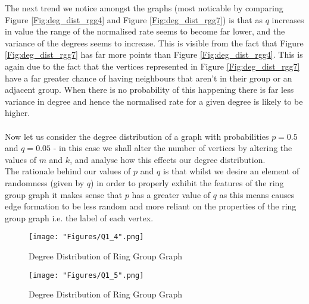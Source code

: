 \documentclass[12pt, a4paper]{article}
\begin{document}
The next trend we notice amongst the graphs (most noticable by comparing Figure \ref{Fig:deg_dist_rgg4} and Figure \ref{Fig:deg_dist_rgg7}) is that as $q$ increases in value the range of the normalised rate seems to become far lower, and the variance of the degrees seems to increase. This is visible from the fact that Figure \ref{Fig:deg_dist_rgg7} has far more points than Figure \ref{Fig:deg_dist_rgg4}. This is again due to the fact that the vertices represented in Figure \ref{Fig:deg_dist_rgg7} have a far greater chance of having neighbours that aren't in their group or an adjacent group. When there is no probability of this happening there is far less variance in degree and hence the normalised rate for a given degree is likely to be higher.\\
\\
Now let us consider the degree distribution of a graph with probabilities $p=0.5$ and $q=0.05$ - in this case we shall alter the number of vertices by altering the values of $m$ and $k$, and analyse how this effects our degree distribution.\\
 The rationale behind our values of $p$ and $q$ is that whilst we desire an element of randomness (given by $q$) in order to properly exhibit the features of the ring group graph it makes sense that $p$ has a greater value of $q$ as this means causes edge formation to be less random and more reliant on the properties of the ring group graph i.e. the label of each vertex.
 \begin{figure}[!htb]
   \begin{minipage}{0.49\textwidth}
     \centering
     \texttt{[image: "Figures/Q1\_4".png]}
     \caption{Degree Distribution of Ring Group Graph}
     \label{Fig:deg_dist_rgg8}
   \end{minipage}\hfill
   \begin{minipage}{0.49\textwidth}
     \centering
     \texttt{[image: "Figures/Q1\_5".png]}
     \caption{Degree Distribution of Ring Group Graph}
     \label{Fig:deg_dist_rgg9}
   \end{minipage}
\end{figure}
\end{document}
